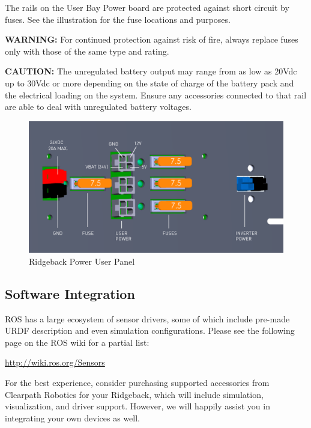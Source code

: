 \documentclass[]{clearpath-latex/clearpath-manual}
\begin{document}
The rails on the User Bay Power board are protected against short circuit by fuses. See the illustration for the fuse locations and purposes. 

\textbf{WARNING:} For continued protection against risk of fire, always replace fuses only with those of the same type and rating.

\textbf{CAUTION:} The unregulated battery output may range from as low as 20Vdc up to 30Vdc or more depending on the state of charge of the battery pack and the electrical loading on the system. Ensure any accessories connected to that rail are able to deal with unregulated battery voltages.
  


\begin{figure}[h]
  \centering
  \includegraphics[width=1.0\linewidth]{Ridgeback_UserPower_SOLID.pdf}
  \caption{Ridgeback Power User Panel}
  \label{userpower}
\end{figure}





\subsection{Software Integration}

ROS has a large ecosystem of sensor drivers, some of which include pre-made URDF description and even simulation configurations.  Please see the following page on the ROS wiki for a partial list:

\url{http://wiki.ros.org/Sensors }

For the best experience, consider purchasing supported accessories from Clearpath Robotics for your Ridgeback, which will include simulation, visualization, and driver support.  However, we will happily assist you in integrating your own devices as well. 
\end{document}

